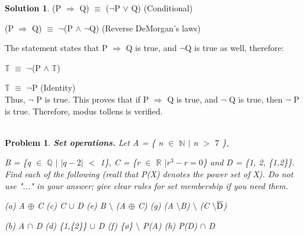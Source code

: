 \documentclass{article}
\newtheorem{problem}{Problem}
\theoremstyle{definition}
\newtheorem*{solution}{Solution}
\begin{document}
\begin{solution}
	(P \(\Rightarrow\) Q) \(\equiv\) (\(\neg\)P \(\vee\) Q) (Conditional)
	
	(P \(\Rightarrow\) Q)	\(\equiv\) \(\neg\)(P \(\wedge\) \(\neg\)Q) (Reverse DeMorgan's laws)
	
	The statement states that P \(\Rightarrow\) Q is true, and \(\neg\)Q is true as well, therefore:
	
	\(\mathbb{T}\) \(\equiv\) \(\neg\)(P \(\wedge\) \(\mathbb{T}\))
	
	\(\mathbb{T}\) \(\equiv\) \(\neg\)P (Identity)\\
	
	Thus, \(\neg\) P is true. This proves that if P \(\Rightarrow\) Q is true, and \(\neg\) Q is true, then \(\neg\) P is true. Therefore, modus tollens is verified.\\\\


\end{solution}

\begin{problem}
\textbf{Set operations.} Let A = \{ n \(\in\) \(\mathbb{N}\) \(|\) n \(>\) \(7\) \}, 

B = \{q \(\in\) \(\mathbb{Q}\) \(|\) \(|q-2|\) \(<\) 1\}, C = \{r \(\in\) \(\mathbb{R}\) \(| {r}^3 - r = 0\)\} and D = \{1, 2, \{1,2\}\}. Find each of the following (reall that P(X) denotes the power set of X). Do not use "..." in your answer; give clear rules for set membership if you need them.

(a) A \(\oplus\) C \: (c) C \(\cup\) D \: (e) B \(\setminus\) (A \(\oplus\) C) \: (g) (A \(\setminus\)B) \(\setminus\) (C \(\setminus\)\(\overline{\rm D}\))

(b) A \(\cap\) D \: (d) \{1,\{2\}\} \(\cup\) D \: (f) \{\o\} \(\setminus\) P(A) \: (h) P(D) \(\cap\) D\\\\

\end{problem}
\end{document}
